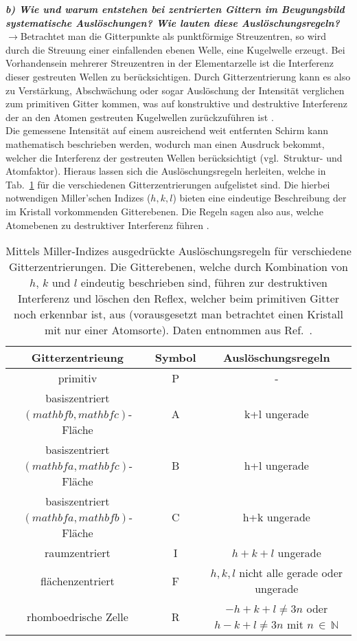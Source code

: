 \textbf{\textit{b) Wie und warum entstehen bei zentrierten Gittern im Beugungsbild 
systematische Auslöschungen? Wie lauten diese Auslöschungsregeln?}}\\
$\rightarrow$Betrachtet man die Gitterpunkte als punktförmige Streuzentren, so wird durch die Streuung einer einfallenden ebenen Welle, 
eine Kugelwelle erzeugt. Bei Vorhandensein mehrerer Streuzentren in der Elementarzelle ist die Interferenz dieser gestreuten Wellen 
zu berücksichtigen. Durch Gitterzentrierung kann es also zu Verstärkung, Abschwächung oder sogar Auslöschung der Intensität verglichen
zum primitiven Gitter kommen, was auf konstruktive und destruktive Interferenz der an den Atomen gestreuten Kugelwellen zurückzuführen ist \cite{EPC}. \\ 
Die gemessene Intensität auf einem ausreichend weit entfernten Schirm kann mathematisch beschrieben werden, wodurch man einen 
Ausdruck bekommt, welcher die Interferenz der gestreuten Wellen berücksichtigt (vgl.~Struktur- und Atomfaktor). 
Hieraus lassen sich die Auslöschungsregeln herleiten, welche in Tab.~\ref{tab:reflex} für 
die verschiedenen Gitterzentrierungen aufgelistet sind. Die hierbei notwendigen Miller'schen Indizes ($h, k, l$) bieten eine eindeutige Beschreibung 
der im Kristall vorkommenden Gitterebenen. Die Regeln sagen also aus, welche Atomebenen zu destruktiver Interferenz führen \cite{Schwarz}.
\begin{table}[h!]
    \centering
    \caption{\label{tab:reflex}Mittels Miller-Indizes ausgedrückte Auslöschungsregeln für verschiedene Gitterzentrierungen. 
    Die Gitterebenen, welche durch Kombination von $h$, $k$ und $l$ eindeutig beschrieben sind, führen zur destruktiven Interferenz und löschen den Reflex, 
    welcher beim primitiven Gitter noch erkennbar ist, aus (vorausgesetzt man betrachtet einen Kristall mit nur einer Atomsorte).
    Daten entnommen aus Ref.~\cite{Schwarz}.}
      \begin{tabular}{c|c|c}
      \rowcolor[rgb]{ .851,  .882,  .949} Gitterzentrieung & Symbol & Auslöschungsregeln \\
      \midrule
      \midrule
      primitiv & P     & - \\
      basiszentriert $(mathbf{b},mathbf{c})$-Fläche & A     & k+l ungerade \\
      basiszentriert $(mathbf{a},mathbf{c})$-Fläche & B     & h+l ungerade \\
      basiszentriert $(mathbf{a},mathbf{b})$-Fläche & C     & h+k ungerade \\
      raumzentriert & I     & $h+k+l$ ungerade \\
      flächenzentriert & F     & $h,k,l$ nicht alle gerade oder ungerade \\
      rhomboedrische Zelle & R     & $-h+k+l\neq 3n$ oder $h-k+l\neq 3n$ mit $n\,\in\,\mathbb{N}$ \\
      \end{tabular}
\end{table}\FloatBarrier
  